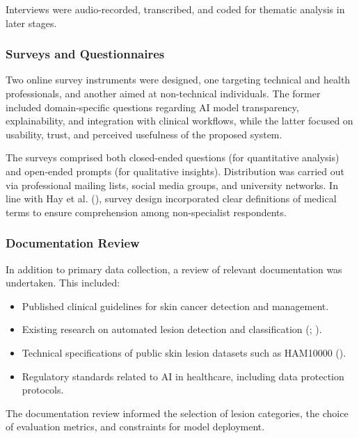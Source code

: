 \documentclass[
  12pt,
  oneside]{article}
\providecommand{\tightlist}{%
  \setlength{\itemsep}{0pt}\setlength{\parskip}{0pt}}
\begin{document}
Interviews were audio-recorded, transcribed, and coded for thematic
analysis in later stages.

\subsubsection{Surveys and
Questionnaires}\label{surveys-and-questionnaires}

Two online survey instruments were designed, one targeting technical and
health professionals, and another aimed at non-technical individuals.
The former included domain-specific questions regarding AI model
transparency, explainability, and integration with clinical workflows,
while the latter focused on usability, trust, and perceived usefulness
of the proposed system.

The surveys comprised both closed-ended questions (for quantitative
analysis) and open-ended prompts (for qualitative insights).
Distribution was carried out via professional mailing lists, social
media groups, and university networks. In line with Hay et al.
(), survey design
incorporated clear definitions of medical terms to ensure comprehension
among non-specialist respondents.

\subsubsection{Documentation Review}\label{documentation-review}

In addition to primary data collection, a review of relevant
documentation was undertaken. This included:

\begin{itemize}
\tightlist
\item
  Published clinical guidelines for skin cancer detection and
  management.
\item
  Existing research on automated lesion detection and classification
  (;
  ).
\item
  Technical specifications of public skin lesion datasets such as
  HAM10000 ().
\item
  Regulatory standards related to AI in healthcare, including data
  protection protocols.
\end{itemize}

The documentation review informed the selection of lesion categories,
the choice of evaluation metrics, and constraints for model deployment.
\end{document}
